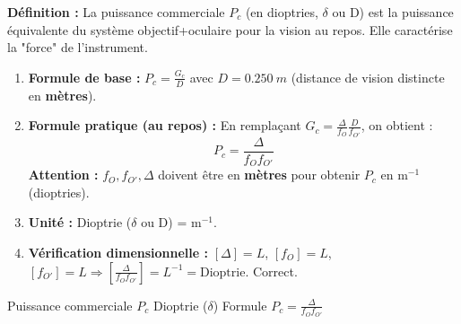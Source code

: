 \documentclass[11pt]{article}
\newcommand{\cle}[1]{{\popxbold\color{popdark}#1}}
\begin{document}
\begin{methode}
\textbf{Définition :} La puissance commerciale $P_c$ (en dioptries, $\delta$ ou D) est la puissance équivalente du système objectif+oculaire pour la vision au repos. Elle caractérise la "force" de l'instrument.
\begin{enumerate}
    \item \textbf{Formule de base :} $P_c = \frac{G_c}{D}$ avec $D = \SI{0,250}{m}$ (distance de vision distincte en \textbf{mètres}).
    \item \textbf{Formule pratique (au repos) :} En remplaçant $G_c = \frac{\Delta}{f_O} \frac{D}{f_{O'}}$, on obtient :
    \[ P_c = \frac{\Delta}{f_O f_{O'}} \]
    \textbf{Attention :} $f_O, f_{O'}, \Delta$ doivent être en \textbf{mètres} pour obtenir $P_c$ en $\text{m}^{-1}$ (dioptries).
    \item \textbf{Unité :} Dioptrie ($\delta$ ou D) = $\text{m}^{-1}$.
    \item \textbf{Vérification dimensionnelle :} $[\Delta] = L$, $[f_O] = L$, $[f_{O'}] = L \Rightarrow [\frac{\Delta}{f_O f_{O'}}] = L^{-1} = \text{Dioptrie}$. Correct.
\end{enumerate}
\cle{Puissance commerciale $P_c$} \cle{Dioptrie ($\delta$)} \cle{Formule $P_c = \frac{\Delta}{f_O f_{O'}}$}
\end{methode}
\end{document}
